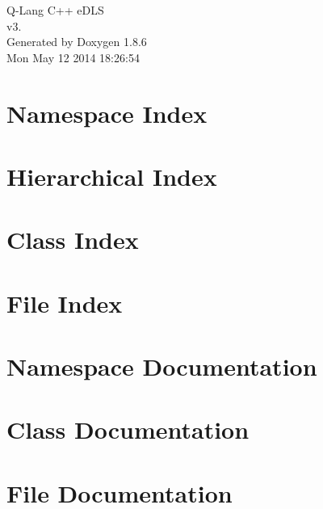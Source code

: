 \documentclass[twoside]{book}
\newcommand{\clearemptydoublepage}{%
  \newpage{\pagestyle{empty}\cleardoublepage}%
}
\begin{document}
\hypersetup{pageanchor=false}
\begin{titlepage}
\vspace*{7cm}
\begin{center}%
{\Large Q-\/\-Lang C++ e\-D\-L\-S \\[1ex]\large v3. }\\
\vspace*{1cm}
{\large Generated by Doxygen 1.8.6}\\
\vspace*{0.5cm}
{\small Mon May 12 2014 18:26:54}\\
\end{center}
\end{titlepage}
\clearemptydoublepage
\tableofcontents
\clearemptydoublepage
{}
\hypersetup{pageanchor=true}

\chapter{Namespace Index}

\chapter{Hierarchical Index}

\chapter{Class Index}

\chapter{File Index}

\chapter{Namespace Documentation}



\chapter{Class Documentation}



















\chapter{File Documentation}



\newpage
{}
{}
\printindex
\end{document}
